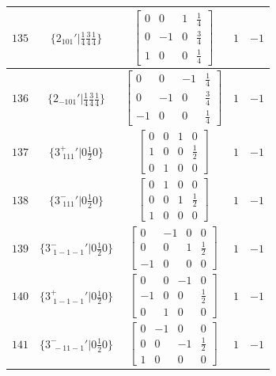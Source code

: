 \documentclass[fleqn,8pt]{jsarticle}
\begin{document}
\begin{longtable}{ccccc}
$ 135 $ & $ \{2{}_{101}{}'|\frac{1}{4} \frac{3}{4} \frac{1}{4}\} $ & $ \begin{bmatrix} 0 & 0 & 1 & \frac{1}{4} \\ 0 & -1 & 0 & \frac{3}{4} \\ 1 & 0 & 0 & \frac{1}{4} \end{bmatrix} $ & $ 1 $ & $ -1 $ \\ \hline
$ 136 $ & $ \{2{}_{-101}{}'|\frac{1}{4} \frac{3}{4} \frac{1}{4}\} $ & $ \begin{bmatrix} 0 & 0 & -1 & \frac{1}{4} \\ 0 & -1 & 0 & \frac{3}{4} \\ -1 & 0 & 0 & \frac{1}{4} \end{bmatrix} $ & $ 1 $ & $ -1 $ \\ \hline
$ 137 $ & $ \{3^{+}_{\,\,111}{}'|0 \frac{1}{2} 0\} $ & $ \begin{bmatrix} 0 & 0 & 1 & 0 \\ 1 & 0 & 0 & \frac{1}{2} \\ 0 & 1 & 0 & 0 \end{bmatrix} $ & $ 1 $ & $ -1 $ \\ \hline
$ 138 $ & $ \{3^{-}_{\,\,111}{}'|0 \frac{1}{2} 0\} $ & $ \begin{bmatrix} 0 & 1 & 0 & 0 \\ 0 & 0 & 1 & \frac{1}{2} \\ 1 & 0 & 0 & 0 \end{bmatrix} $ & $ 1 $ & $ -1 $ \\ \hline
$ 139 $ & $ \{3^{-}_{\,\,1-1-1}{}'|0 \frac{1}{2} 0\} $ & $ \begin{bmatrix} 0 & -1 & 0 & 0 \\ 0 & 0 & 1 & \frac{1}{2} \\ -1 & 0 & 0 & 0 \end{bmatrix} $ & $ 1 $ & $ -1 $ \\ \hline
$ 140 $ & $ \{3^{+}_{\,\,1-1-1}{}'|0 \frac{1}{2} 0\} $ & $ \begin{bmatrix} 0 & 0 & -1 & 0 \\ -1 & 0 & 0 & \frac{1}{2} \\ 0 & 1 & 0 & 0 \end{bmatrix} $ & $ 1 $ & $ -1 $ \\ \hline
$ 141 $ & $ \{3^{-}_{\,\,-11-1}{}'|0 \frac{1}{2} 0\} $ & $ \begin{bmatrix} 0 & -1 & 0 & 0 \\ 0 & 0 & -1 & \frac{1}{2} \\ 1 & 0 & 0 & 0 \end{bmatrix} $ & $ 1 $ & $ -1 $ \\ \hline

\end{longtable}
\end{document}
